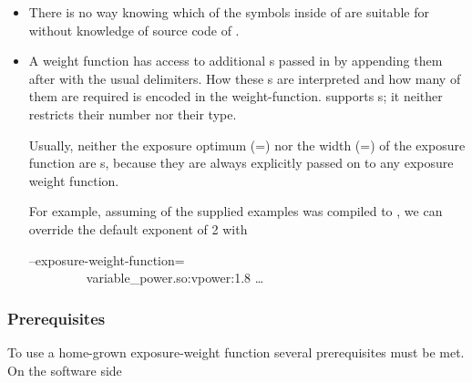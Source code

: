 \begin{itemize}
\begin{restrictedmaterial}{Windows}
    For details consult the manual page of LoadLibrary.
  \end{restrictedmaterial}

\item
  There is no way knowing which of the symbols inside of  are suitable
  for  without knowledge of source code of .

\item
  A weight function has access to additional s passed in by appending them
  after  with the usual delimiters.  How these s are
  interpreted and how many of them are required is encoded in the weight-function.  \App{}
  supports s; it neither restricts their number nor their type.

  \begin{geeknote}%
    Usually, neither the exposure optimum
    (=\feasiblebreak{}) nor the width
    (=\feasiblebreak{}) of the exposure function are
    s, because they are always explicitly passed on to any exposure weight
    function.
  \end{geeknote}

  For example, assuming  of the supplied examples was compiled to
  , we can override the default exponent of 2 with

  \begin{literal}
    \app{} --exposure-weight-function=\bslash \\
    ~~~~~~~~~variable\_power.so:vpower:1.8 \dots
  \end{literal}
\end{itemize}


\subsubsection[Prerequisites]{\label{sec:prerequisites}%
  Prerequisites}

To use a home-grown exposure-weight function several prerequisites must be met.  On the software
side


